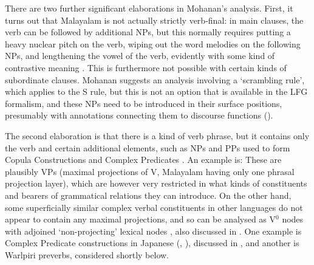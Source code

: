 \documentclass[output=paper,hidelinks]{langscibook}
\begin{document}
There are two further significant elaborations in Mohanan's analysis.  First, it turns out
that Malayalam is not actually strictly verb-final: in main clauses, the verb
can be followed by additional NPs, but this normally requires putting a heavy
nuclear pitch on the verb, wiping out the word melodies on the following NPs,
and lengthening the vowel of the verb, evidently with some kind of contrastive
meaning \citep[511]{mohanan1982}.  This is furthermore not possible with certain
kinds of subordinate clauses.  Mohanan suggests an analysis involving a `scrambling
rule', which applies to the S rule, but this is not an option that is available
in the LFG formalism, and these NPs need to be introduced in their surface positions,
presumably with annotations connecting them to discourse functions ().

The second elaboration
is that there is a kind of verb phrase, but it contains only the
verb and certain additional elements, such as NPs and PPs used to form Copula 
Constructions and Complex Predicates \citep[513-534]{mohanan1982}.
An example is:
These are plausibly VPs (maximal projections of V, Malayalam having only one
phrasal projection layer), which are however very restricted in what kinds of constituents
and bearers of grammatical relations they can introduce. On the other hand,
some superficially similar complex verbal constituents in other languages
do not appear to contain any maximal projections, and so can be analysed as
V$^0$ nodes with adjoined `non-projecting' lexical nodes \citep{Toivonen2001},
also discussed in . One example  is Complex
Predicate constructions in Japanese (\citealt{Ishikawa1985}, \citealt{Matsumoto1996}),
discussed in , and another is Warlpiri preverbs,
considered shortly below.
\end{document}
